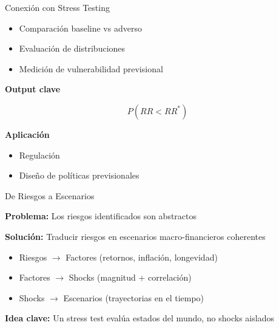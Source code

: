 \documentclass{beamer}
\begin{document}
\begin{frame}{Conexión con Stress Testing}
\begin{itemize}
\item Comparación baseline vs adverso
\item Evaluación de distribuciones
\item Medición de vulnerabilidad previsional
\end{itemize}

\vspace{0.3cm}

\textbf{Output clave}

\[
P(RR < RR^*)
\]

\vspace{0.3cm}

\textbf{Aplicación}

\begin{itemize}
\item Regulación
\item Diseño de políticas previsionales
\end{itemize}
\end{frame}
\begin{frame}{De Riesgos a Escenarios}

\textbf{Problema:}  
Los riesgos identificados son abstractos

\vspace{0.3cm}

\textbf{Solución:}  
Traducir riesgos en escenarios macro-financieros coherentes

\vspace{0.3cm}

\begin{itemize}
\item Riesgos $\rightarrow$ Factores (retornos, inflación, longevidad)
\item Factores $\rightarrow$ Shocks (magnitud + correlación)
\item Shocks $\rightarrow$ Escenarios (trayectorias en el tiempo)
\end{itemize}

\vspace{0.4cm}

\textbf{Idea clave:}  
Un stress test evalúa estados del mundo, no shocks aislados

\end{frame}
\end{document}
